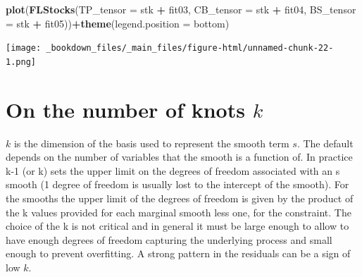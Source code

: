 \documentclass[
]{book}
\newenvironment{Shaded}{\begin{snugshade}}{\end{snugshade}}
\newcommand{\AttributeTok}[1]{\textcolor[rgb]{0.13,0.29,0.53}{#1}}
\newcommand{\FunctionTok}[1]{\textcolor[rgb]{0.13,0.29,0.53}{\textbf{#1}}}
\newcommand{\NormalTok}[1]{#1}
\newcommand{\SpecialCharTok}[1]{\textcolor[rgb]{0.81,0.36,0.00}{\textbf{#1}}}
\newcommand{\StringTok}[1]{\textcolor[rgb]{0.31,0.60,0.02}{#1}}
\begin{document}
\begin{Shaded}
\begin{Highlighting}[]
\FunctionTok{plot}\NormalTok{(}\FunctionTok{FLStocks}\NormalTok{(}\AttributeTok{TP\_tensor =}\NormalTok{ stk }\SpecialCharTok{+}\NormalTok{ fit03,}
              \AttributeTok{CB\_tensor =}\NormalTok{ stk }\SpecialCharTok{+}\NormalTok{ fit04,}
              \AttributeTok{BS\_tensor =}\NormalTok{ stk }\SpecialCharTok{+}\NormalTok{ fit05))}\SpecialCharTok{+}\FunctionTok{theme}\NormalTok{(}\AttributeTok{legend.position =} \StringTok{\textquotesingle{}bottom\textquotesingle{}}\NormalTok{)}
\end{Highlighting}
\end{Shaded}

\texttt{[image: \_bookdown\_files/\_main\_files/figure-html/unnamed-chunk-22-1.png]}

\hypertarget{on-the-number-of-knots-k}{%
\section{\texorpdfstring{On the number of knots \(k\)}{On the number of knots k}}\label{on-the-number-of-knots-k}}

\(k\) is the dimension of the basis used to represent the smooth term \(s\). The default depends on the number of variables that the smooth is a function of. In practice k-1 (or k) sets the upper limit on the degrees of freedom associated with an s smooth (1 degree of freedom is usually lost to the intercept of the smooth). For the smooths the upper limit of the degrees of freedom is given by the product of the k values provided for each marginal smooth less one, for the constraint. The choice of the k is not critical and in general it must be large enough to allow to have enough degrees of freedom capturing the underlying process and small enough to prevent overfitting. A strong pattern in the residuals can be a sign of low \(k\).
\end{document}
